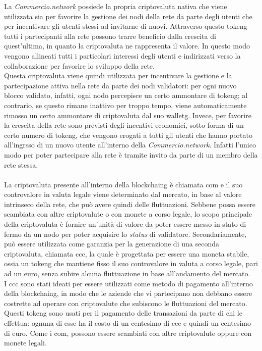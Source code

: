 La \textit{Commercio.network} possiede la propria criptovaluta nativa che viene utilizzata sia per favorire la gestione dei nodi della rete da parte degli utenti che per incentivare gli utenti stessi ad invitarne di nuovi. Attraverso questo \gls{tokeng} tutti i partecipanti alla rete possono trarre beneficio dalla crescita di quest'ultima, in quanto la criptovaluta ne rappresenta il valore. In questo modo vengono allineati tutti i particolari interessi degli utenti e indirizzati verso la collaborazione per favorire lo sviluppo della rete.\\
Questa criptovaluta viene quindi utilizzata per incentivare la gestione e la partecipazione attiva nella rete da parte dei nodi validatori: per ogni nuovo blocco validato, infatti, ogni nodo percepisce un certo ammontare di \gls{tokeng}; al contrario, se questo rimane inattivo per troppo tempo, viene automaticamente rimosso un certo ammontare di criptovaluta dal suo \gls{walletg}. Invece, per favorire la crescita della rete sono previsti degli incentivi economici, sotto forma di un certo numero di \gls{tokeng}, che vengono erogati a tutti gli utenti che hanno portato all'ingrsso di un nuovo utente all'interno della \textit{Commercio.network}. Infatti l'unico modo per poter partecipare alla rete è tramite invito da parte di un membro della rete stessa.\\\\
La criptovaluta presente all'interno della \gls{blockchaing} è chiamata \gls{com}\glsfirstoccur{} e il suo controvalore in valuta legale viene determinato dal mercato, in base al valore intrinseco della rete, che può avere quindi delle fluttuazioni. Sebbene possa essere scambiata con altre criptovalute o con monete a corso legale, lo scopo principale della criptovaluta è fornire un'unità di valore da poter essere messo in stato di fermo da un nodo per poter acquisire lo \textit{status} di validatore. Secondariamente, può essere utilizzata come garanzia per la generazione di una seconda criptovaluta, chiamata \gls{ccc}\glsfirstoccur, la quale è progettata per essere una moneta stabile, ossia un \gls{tokeng} che mantiene fisso il suo controvalore in valuta a corso legale, pari ad un euro, senza subire alcuna fluttuazione in base all'andamento del mercato.\\
I \gls{ccc} sono stati ideati per essere utilizzati come metodo di pagamento all'interno della \gls{blockchaing}, in modo che le aziende che vi partecipano non debbano essere costrette ad operare con criptovalute che subiscono le fluttuazioni del mercato. Questi \gls{tokeng} sono usati per il pagamento delle transazioni da parte di chi le effettua: ognuna di esse ha il costo di un centesimo di \gls{ccc} e quindi un centesimo di euro. Come i \gls{com}, possono essere scambiati con altre criptovalute oppure con monete legali.

